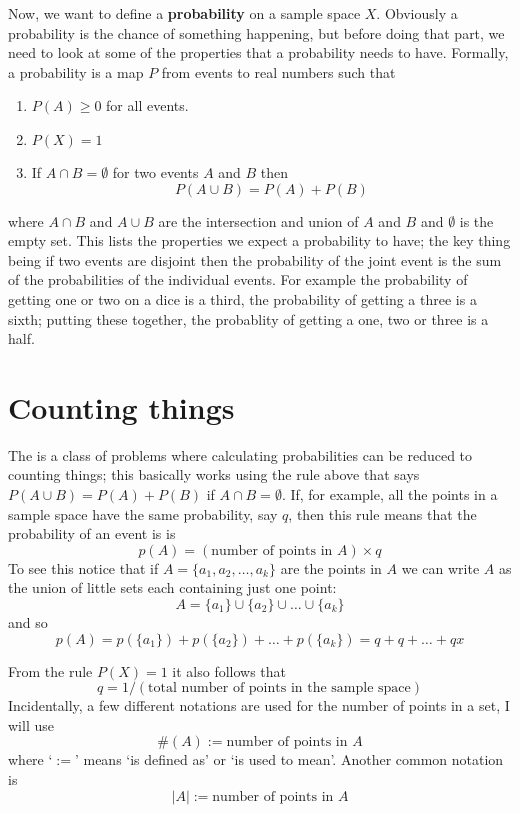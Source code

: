 \documentclass[11pt,a4paper]{scrartcl}
\begin{document}
Now, we want to define a \textbf{probability} on a sample space
$X$. Obviously a probability is the chance of something happening, but
before doing that part, we need to look at some of the properties that
a probability needs to have. Formally, a probability is a map $P$ from
events to real numbers such that
\begin{enumerate}
\item $P(A)\ge 0$ for all events.
\item $P(X)=1$
\item If $A\cap B=\emptyset$ for two events $A$ and $B$ then 
\begin{equation}
P(A\cup B)=P(A)+P(B)
\end{equation}
\end{enumerate}
where $A\cap B$ and $A\cup B$ are the intersection and union of $A$
and $B$ and $\emptyset$ is the empty set. This lists the properties we
expect a probability to have; the key thing being if two events are
disjoint then the probability of the joint event is the sum of the
probabilities of the individual events. For example the probability of
getting one or two on a dice is a third, the probability of getting a
three is a sixth; putting these together, the probablity of getting a
one, two or three is a half.

\section*{Counting things}

The is a class of problems where calculating probabilities can be
reduced to counting things; this basically works using the rule above
that says $P(A\cup B)=P(A)+P(B)$ if $A\cap B=\emptyset$. If, for
example, all the points in a sample space have the same probability, say $q$, then
this rule means that the probability of an event is is 
\begin{equation}
p(A)=(\mbox{number of points in }A)\times q
\end{equation}
To see this notice that if $A=\{a_1,a_2,\ldots,a_k\}$ are the points in $A$ we can write $A$ as the union of little sets each containing just one point:
\begin{equation}
A=\{a_1\}\cup\{a_2\}\cup\ldots\cup\{a_k\}
\end{equation}
and so
\begin{equation}
p(A)=p(\{a_1\})+p(\{a_2\})+\ldots+p(\{a_k\})=q+q+\ldots+qx
\end{equation}

From the rule $P(X)=1$ it also follows that 
\begin{equation}
q=1/(\mbox{total number of points in the sample space})
\end{equation}
Incidentally, a few different notations are used for the number of points in a set, I will use
\begin{equation}
\#(A):=\mbox{number of points in }A
\end{equation}
where \lq{}$:=$\rq{} means \lq{}is defined as\rq{} or \lq{}is used to
mean\rq{}. Another common notation is
\begin{equation}
|A|:=\mbox{number of points in }A
\end{equation}
\end{document}
